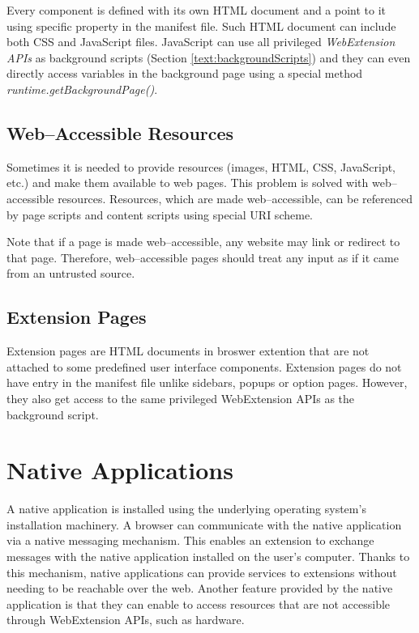 Every component is defined with its own HTML document and a point to it using specific property in the manifest file. Such HTML document can include both CSS and JavaScript files. JavaScript can use all privileged\textit{ WebExtension APIs} as background scripts (Section \ref{text:backgroundScripts}) and they can even directly access variables in the background page using a special method \textit{runtime.getBackgroundPage()}.

\subsection{Web--Accessible Resources}
Sometimes it is needed to provide resources (images, HTML, CSS, JavaScript, etc.) and make them available to web pages. This problem is solved with web--accessible resources. Resources, which are made web--accessible, can be referenced by page scripts and content scripts using special URI scheme.

Note that if a page is made web--accessible, any website may link or redirect to that page. Therefore, web--accessible pages should treat any input as if it came from an untrusted source.

\subsection{Extension Pages}
Extension pages are HTML documents in broswer extention that are not attached to some predefined user interface components. Extension pages do not have entry in the manifest file unlike sidebars, popups or option pages. However, they also get access to the same privileged WebExtension APIs as the background script.

\section{Native Applications}
A native application is installed using the underlying operating system's installation machinery. A browser can communicate with the native application via a native messaging mechanism. This enables an extension to exchange messages with the native application installed on the user's computer. Thanks to this mechanism, native applications can provide services to extensions without needing to be reachable over the web. Another feature provided by the native application is that they can enable to access resources that are not accessible through WebExtension APIs, such as hardware.


